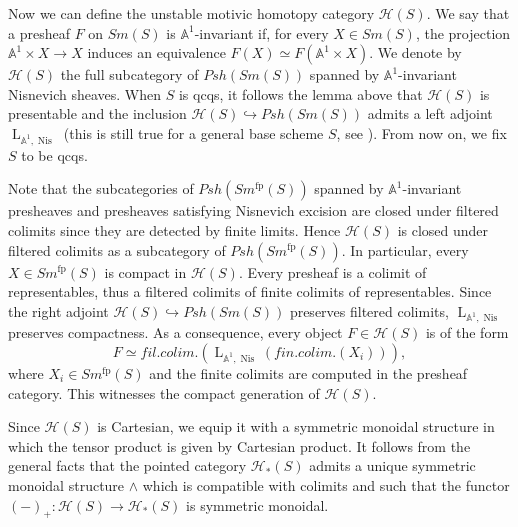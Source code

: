 \documentclass{article}
\theoremstyle{definition}
\newcommand{\on}{\operatorname}
\begin{document}
Now we can define the unstable motivic homotopy category $\mathcal{H}(S)$. We say that a presheaf $F$ on $Sm(S)$ is $\mathbb{A}^1$-invariant if, for every $X \in Sm(S)$, the projection $\mathbb{A}^1 \times X \rightarrow X$ induces an equivalence $F(X) \simeq F\left(\mathbb{A}^1 \times X\right)$. We denote by $\mathcal{H}(S)$ the full subcategory of $Psh(Sm(S))$ spanned by $\mathbb{A}^1$-invariant Nisnevich sheaves. When $S$ is qcqs, it follows the lemma above that $\mathcal{H}(S)$ is presentable and the inclusion $\mathcal{H}(S)\hookrightarrow Psh(Sm(S))$ admits a left adjoint $\on{L}_{\mathbb{A}^1,\on{Nis}}$ (this is still true for a general base scheme $S$, see \cite[Proposition C.5.(1)]{Hoy}). From now on, we fix $S$ to be qcqs.


Note that the subcategories of $Psh(Sm^{\on{fp}}(S))$ spanned by $\mathbb{A}^1$-invariant presheaves and presheaves satisfying Nisnevich excision are closed under filtered colimits since they are detected by finite limits. Hence $\mathcal{H}(S)$ is closed under filtered colimits as a subcategory of $Psh(Sm^{\on{fp}}(S))$. In particular, every $X\in Sm^{\on{fp}}(S)$ is compact in $\mathcal{H}(S)$. Every presheaf is a colimit of representables, thus a filtered colimits of finite colimits of representables. Since the right adjoint $\mathcal{H}(S)\hookrightarrow Psh(Sm(S))$ preserves filtered colimits, $\on{L}_{\mathbb{A}^1,\on{Nis}}$ preserves compactness. As a consequence, every object $F\in\mathcal{H}(S)$ is of the form\[
F\simeq fil.colim.(\on{L}_{\mathbb{A}^1,\on{Nis}}(fin.colim. (X_i))),\]
where $X_i\in Sm^{\on{fp}}(S)$ and the finite colimits are computed in the presheaf category. This witnesses the compact generation of $\mathcal{H}(S)$.


Since $\mathcal{H}(S)$ is Cartesian, we equip it with a symmetric monoidal structure in which the tensor product is given by Cartesian product. It follows from the general facts that the pointed category $\mathcal{H}_\ast(S)$ admits a unique symmetric monoidal structure $\wedge$ which is compatible with colimits and such that the functor $(-)_+: \mathcal{H}(S)\rightarrow \mathcal{H}_\ast(S)$ is symmetric monoidal.
\end{document}
